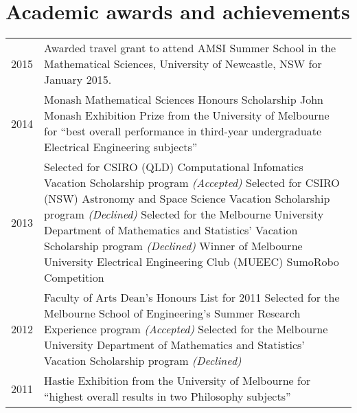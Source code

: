 \documentclass[12pt,a4paper]{article}
\newenvironment{llist}
	{\renewcommand{\arraystretch}{1.5}\begin{longtable}{p{3.5cm} p{12cm}}}
	{\end{longtable}}
\begin{document}
\section*{Academic awards and achievements}

\begin{llist}
  2015 & Awarded travel grant to attend AMSI Summer School in the Mathematical
         Sciences, University of Newcastle, NSW for January 2015. \\
  2014 & Monash Mathematical Sciences Honours Scholarship \newline \newline
         John Monash Exhibition Prize from the University of Melbourne for ``best overall
         performance in third-year undergraduate Electrical Engineering subjects'' \\
  2013 & Selected for CSIRO (QLD) Computational Infomatics Vacation Scholarship
         program \textit{(Accepted)} \newline \newline
         Selected for CSIRO (NSW) Astronomy and Space Science Vacation
         Scholarship program \textit{(Declined)}\newline \newline
         Selected for the Melbourne University Department of Mathematics and
         Statistics' Vacation Scholarship program \textit{(Declined)} \newline \newline
         Winner of Melbourne University Electrical Engineering Club (MUEEC)
         SumoRobo Competition \\
	2012 & Faculty of Arts Dean's Honours List for 2011 \newline \newline
         Selected for the Melbourne School of Engineering's Summer Research
         Experience program \textit{(Accepted)} \newline \newline
         Selected for the Melbourne University Department of Mathematics and
         Statistics' Vacation Scholarship program \textit{(Declined)} \\
  2011 & Hastie Exhibition from the University of Melbourne for ``highest overall results in two
         Philosophy subjects''
\end{llist}
\end{document}
